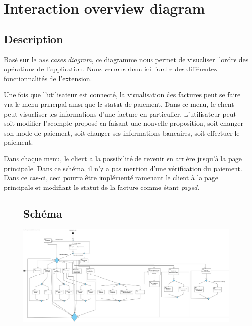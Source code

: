 \section{Interaction overview diagram}
\subsection{Description}

\begin{flushleft}
Basé sur le \emph{use cases diagram}, ce diagramme nous permet de visualiser l'ordre des opérations de l'application. Nous verrons donc ici l'ordre des différentes fonctionnalités de l'extension.
\end{flushleft}

\begin{flushleft}
Une fois que l'utilisateur est connecté, la visualisation des factures peut se faire via le menu principal ainsi que le statut de paiement. Dans ce menu, le client peut visualiser les informations d'une facture en particulier.
L'utilisateur peut soit modifier l'acompte proposé en faisant une nouvelle proposition, soit changer son mode de paiement, soit changer ses informations bancaires, soit effectuer le paiement.
\end{flushleft}

\begin{flushleft}
Dans chaque menu, le client a la possibilité de revenir en arrière jusqu'à la page principale. Dans ce schéma, il n'y a pas mention d'une vérification du paiement. Dans ce cas-ci, ceci pourra être implémenté ramenant le client à la page principale et modifiant le statut de la facture comme étant \emph{payed}.
\end{flushleft}

\newpage
\begin{figure}[h]
\subsection{Schéma}
\centering
\includegraphics[width = 1.2\textwidth]{extension-maxime/interaction/img/interaction-extension.png}
\end{figure}

